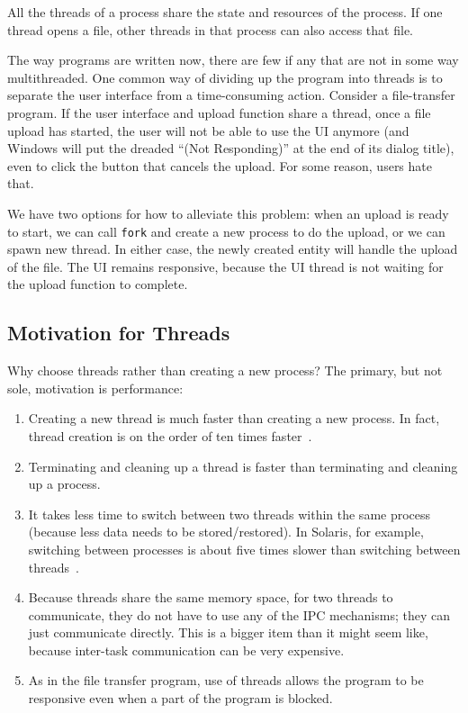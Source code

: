 \documentclass[a4paper]{report}
\begin{document}
All the threads of a process share the state and resources of the process. If one thread opens a file, other threads in that process can also access that file.

The way programs are written now, there are few if any that are not in some way multithreaded. One common way of dividing up the program into threads is to separate the user interface from a time-consuming action. Consider a file-transfer program. If the user interface and upload function share a thread, once a file upload has started, the user will not be able to use the UI anymore (and Windows will put the dreaded ``(Not Responding)'' at the end of its dialog title), even to click the button that cancels the upload. For some reason, users hate that.

We have two options for how to alleviate this problem: when an upload is ready to start, we can call \texttt{fork} and create a new process to do the upload, or we can spawn  new thread. In either case, the newly created entity will handle the upload of the file. The UI remains responsive, because the UI thread is not waiting for the upload function to complete.

\subsection*{Motivation for Threads}

Why choose threads rather than creating a new process? The primary, but not sole, motivation is performance:
\begin{enumerate}
	\item Creating a new thread is much faster than creating a new process. In fact, thread creation is on the order of ten times faster~\cite{machThreads}.
	\item Terminating and cleaning up a thread is faster than terminating and cleaning up a process.
	\item It takes less time to switch between two threads within the same process (because less data needs to be stored/restored). In Solaris, for example, switching between processes is about five times slower than switching between threads~\cite{osc}.
	\item Because threads share the same memory space, for two threads to communicate, they do not have to use any of the IPC mechanisms; they can just communicate directly. This is a bigger item than it might seem like, because inter-task communication can be very expensive.
	\item As in the file transfer program, use of threads allows the program to be responsive even when a part of the program is blocked.
\end{enumerate}
\end{document}
